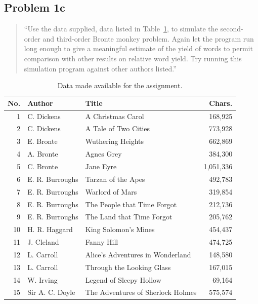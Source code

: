 \documentclass[conference]{IEEEtran}
\begin{document}
\subsection{Problem 1c}

\begin{quote}
``Use the data supplied, data listed in Table~\ref{tab:data}, to simulate the 
second-order and third-order Bronte monkey problem. Again let the program run 
long enough to give a meaningful estimate of the yield of words to permit 
comparison with other results on relative word yield. Try running this 
simulation program against other authors listed.''
\end{quote}

\begin{table}
\caption{Data made available for the assignment.\label{tab:data}}
\vspace{-18pt}
\begin{center}
\begin{tabular}{r@{\hspace{1.1em}}l@{\hspace{1.1em}}l@{\hspace{0.75em}}r}
\hline
No. & Author & Title & Chars. \\
\hline
1  & C. Dickens & A Christmas Carol & 168,925 \\
2  & C. Dickens & A Tale of Two Cities & 773,928 \\
3  & E. Bronte & Wuthering Heights & 662,869 \\
4  & A. Bronte & Agnes Grey & 384,300 \\
5  & C. Bronte & Jane Eyre & 1,051,336 \\
6  & E. R. Burroughs & Tarzan of the Apes & 492,783 \\
7  & E. R. Burroughs & Warlord of Mars & 319,854 \\
8  & E. R. Burroughs & The People that Time Forgot & 212,736 \\
9  & E. R. Burroughs & The Land that Time Forgot & 205,762 \\
10 & H. R. Haggard & King Solomon's Mines & 454,437 \\
11 & J. Cleland & Fanny Hill & 474,725 \\
12 & L. Carroll & Alice's Adventures in Wonderland & 148,580 \\
13 & L. Carroll & Through the Looking Glass & 167,015 \\
14 & W. Irving & Legend of Sleepy Hollow & 69,164 \\
15 & Sir A. C. Doyle & The Adventures of Sherlock Holmes & 575,574 \\

\end{tabular}
\end{center}
\end{table}
\end{document}
